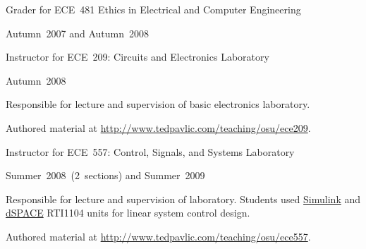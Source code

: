 \documentclass[10pt]{article}           %
\newcommand{\halfblankline}{\quad\vspace{-0.5\baselineskip}\pagebreak[3]}
\begin{document}
\begin{outerlist}
\begin{innerlist}
        \halfblankline

        \item Grader for ECE~481 Ethics in Electrical and Computer Engineering
        \begin{innerlist}
            \item Autumn~2007 and Autumn~2008
        \end{innerlist}

        \halfblankline

        \item Instructor for ECE~209: Circuits and Electronics
            Laboratory
        \begin{innerlist}
            \item Autumn~2008


            \item Responsible for lecture and supervision of basic
                electronics laboratory.

            \item Authored material at
                \url{http://www.tedpavlic.com/teaching/osu/ece209}.
        \end{innerlist}

        \halfblankline

        \item Instructor for ECE~557: Control, Signals, and Systems
            Laboratory
        \begin{innerlist}
            \item Summer~2008~(2~sections) and Summer~2009


            \item Responsible for lecture and supervision of laboratory.
                Students used
                \href{http://www.mathworks.com/products/simulink/}{Simulink}
                and \href{http://www.dspaceinc.com/}{dSPACE} RTI1104
                units for linear system control design.

            \item Authored material at
                \url{http://www.tedpavlic.com/teaching/osu/ece557}.
        \end{innerlist}

        \halfblankline


\end{innerlist}
\end{outerlist}
\end{document}
